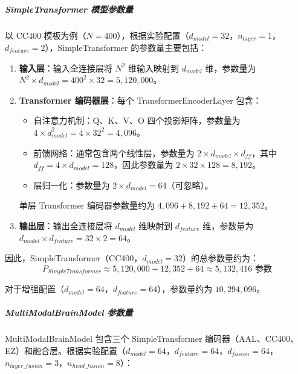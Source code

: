 \documentclass[12pt,a4paper]{article}
\begin{document}
\subparagraph{SimpleTransformer 模型参数量}

以 CC400 模板为例（$N=400$），根据实验配置（$d_{model}=32$，$n_{layer}=1$，$d_{feature}=2$），SimpleTransformer 的参数量主要包括：

\begin{enumerate}
\item \textbf{输入层}：输入全连接层将 $N^2$ 维输入映射到 $d_{model}$ 维，参数量为 $N^2 \times d_{model} = 400^2 \times 32 = 5,120,000$。
\item \textbf{Transformer 编码器层}：每个 TransformerEncoderLayer 包含：
  \begin{itemize}
  \item 自注意力机制：Q、K、V、O 四个投影矩阵，参数量为 $4 \times d_{model}^2 = 4 \times 32^2 = 4,096$。
  \item 前馈网络：通常包含两个线性层，参数量为 $2 \times d_{model} \times d_{ff}$，其中 $d_{ff} = 4 \times d_{model} = 128$，因此参数量为 $2 \times 32 \times 128 = 8,192$。
  \item 层归一化：参数量为 $2 \times d_{model} = 64$（可忽略）。
  \end{itemize}
  单层 Transformer 编码器参数量约为 $4,096 + 8,192 + 64 = 12,352$。
\item \textbf{输出层}：输出全连接层将 $d_{model}$ 维映射到 $d_{feature}$ 维，参数量为 $d_{model} \times d_{feature} = 32 \times 2 = 64$。
\end{enumerate}

因此，SimpleTransformer（CC400，$d_{model}=32$）的总参数量约为：
\begin{equation}
P_{SimpleTransformer} \approx 5,120,000 + 12,352 + 64 \approx 5,132,416 \text{ 参数}
\end{equation}

对于增强配置（$d_{model}=64$，$d_{feature}=64$），参数量约为 $10,294,096$。

\subparagraph{MultiModalBrainModel 参数量}

MultiModalBrainModel 包含三个 SimpleTransformer 编码器（AAL、CC400、EZ）和融合层。根据实验配置（$d_{model}=64$，$d_{feature}=64$，$d_{fusion}=64$，$n_{layer\_fusion}=3$，$n_{head\_fusion}=8$）：
\end{document}
